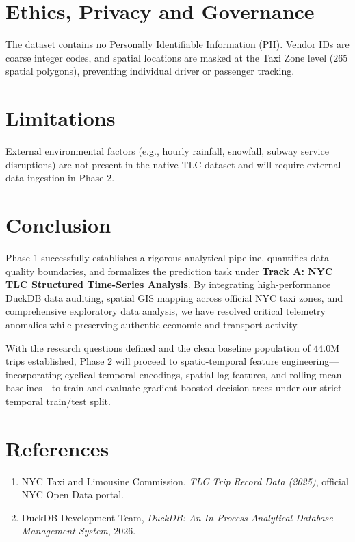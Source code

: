 \documentclass[11pt,a4paper]{article}
\begin{document}
\section{Ethics, Privacy and Governance}
The dataset contains no Personally Identifiable Information (PII). Vendor IDs are coarse integer codes, and spatial locations are masked at the Taxi Zone level ($265$ spatial polygons), preventing individual driver or passenger tracking.

\section{Limitations}
External environmental factors (e.g., hourly rainfall, snowfall, subway service disruptions) are not present in the native TLC dataset and will require external data ingestion in Phase 2.

\section{Conclusion}
Phase 1 successfully establishes a rigorous analytical pipeline, quantifies data quality boundaries, and formalizes the prediction task under \textbf{Track A: NYC TLC Structured Time-Series Analysis}. By integrating high-performance DuckDB data auditing, spatial GIS mapping across official NYC taxi zones, and comprehensive exploratory data analysis, we have resolved critical telemetry anomalies while preserving authentic economic and transport activity. 

With the research questions defined and the clean baseline population of $44.0\text{M}$ trips established, Phase 2 will proceed to spatio-temporal feature engineering—incorporating cyclical temporal encodings, spatial lag features, and rolling-mean baselines—to train and evaluate gradient-boosted decision trees under our strict temporal train/test split.

\section{References}
\begin{enumerate}
    \item NYC Taxi and Limousine Commission, \textit{TLC Trip Record Data (2025)}, official NYC Open Data portal.
    \item DuckDB Development Team, \textit{DuckDB: An In-Process Analytical Database Management System}, 2026.
\end{enumerate}
\end{document}
